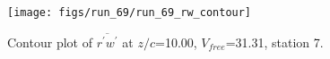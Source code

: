 \begin{figure}[H]
\centering
\texttt{[image: figs/run\_69/run\_69\_rw\_contour]}
\caption{Contour plot of $\overline{r^\prime w^\prime}$ at $z/c$=10.00, $V_{free}$=31.31, station 7.}
\label{fig:run_69_rw_contour}
\end{figure}


